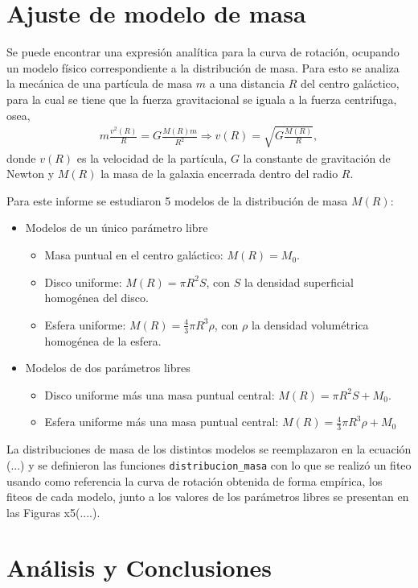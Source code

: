 \documentclass[letterpaper,oneside]{article}
\begin{document}
\section{Ajuste de modelo de masa}
Se puede encontrar una expresión analítica para la curva de rotación, ocupando un modelo físico correspondiente a la distribución de masa. Para esto se analiza la mecánica de una partícula de masa $m$ a una distancia $R$ del centro galáctico, para la cual se tiene que la fuerza gravitacional se iguala a la fuerza centrifuga, osea,
\begin{gather*}
m\frac{v^2(R)}{R}=G\frac{M(R)m}{R^2} \Rightarrow v(R)=\sqrt{G\frac{M(R)}{R}},
\end{gather*}
donde $v(R)$ es la velocidad de la partícula, $G$ la constante de gravitación de Newton y $M(R)$ la masa de la galaxia encerrada dentro del radio $R$.

Para este informe se estudiaron 5 modelos de la distribución de masa $M(R)$:
\begin{itemize}
\item Modelos de un único parámetro libre
\begin{itemize}
\item Masa puntual en el centro galáctico: $M(R)=M_0$.
\item Disco uniforme: $M(R)=\pi R^2S$, con $S$ la densidad superficial homogénea del disco.
\item Esfera uniforme: $M(R)=\frac{4}{3}\pi R^3 \rho$, con $\rho$ la densidad volumétrica homogénea de la esfera.
\end{itemize}
\item Modelos de dos parámetros libres
\begin{itemize}
\item Disco uniforme más una masa puntual central: $M(R)=\pi R^2S+M_0$.
\item Esfera uniforme más una masa puntual central: $M(R)=\frac{4}{3}\pi R^3 \rho+M_0$
\end{itemize}
\end{itemize}

La distribuciones de masa de los distintos modelos se reemplazaron en la ecuación (...) y se definieron las funciones \texttt{distribucion\_masa} con lo que se realizó un fiteo usando como referencia la curva de rotación obtenida de forma empírica, los fiteos de cada modelo, junto a los valores de los parámetros libres se presentan en las Figuras x5(....).
\section{Análisis y Conclusiones}
\end{document}
